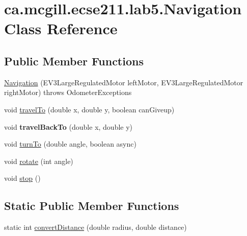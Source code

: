 \hypertarget{classca_1_1mcgill_1_1ecse211_1_1lab5_1_1_navigation}{}\section{ca.\+mcgill.\+ecse211.\+lab5.\+Navigation Class Reference}
\label{classca_1_1mcgill_1_1ecse211_1_1lab5_1_1_navigation}
\subsection*{Public Member Functions}
\begin{DoxyCompactItemize}
\item 
\hyperlink{classca_1_1mcgill_1_1ecse211_1_1lab5_1_1_navigation_a93b746f61226c3b14532c43d0c2f61dd}{Navigation} (E\+V3\+Large\+Regulated\+Motor left\+Motor, E\+V3\+Large\+Regulated\+Motor right\+Motor)  throws Odometer\+Exceptions 
\item 
void \hyperlink{classca_1_1mcgill_1_1ecse211_1_1lab5_1_1_navigation_a0f3288c38c7c28b495ae4d7e95d85f78}{travel\+To} (double x, double y, boolean can\+Giveup)
\item 
\mbox{\label{classca_1_1mcgill_1_1ecse211_1_1lab5_1_1_navigation_aacb83ee18419dcd6095e331975cf2167}} 
void {\bfseries travel\+Back\+To} (double x, double y)
\item 
void \hyperlink{classca_1_1mcgill_1_1ecse211_1_1lab5_1_1_navigation_a2b39928c8062fe6863de8e818d009e91}{turn\+To} (double angle, boolean async)
\item 
void \hyperlink{classca_1_1mcgill_1_1ecse211_1_1lab5_1_1_navigation_a5fcce0063a6b557d349a6fb5bf144c64}{rotate} (int angle)
\item 
void \hyperlink{classca_1_1mcgill_1_1ecse211_1_1lab5_1_1_navigation_afe038af6692e7ad28c3587cd979d7223}{stop} ()
\end{DoxyCompactItemize}
\subsection*{Static Public Member Functions}
\begin{DoxyCompactItemize}
\item 
static int \hyperlink{classca_1_1mcgill_1_1ecse211_1_1lab5_1_1_navigation_a85122ad723d0988c118866f367073be6}{convert\+Distance} (double radius, double distance)
\end{DoxyCompactItemize}


